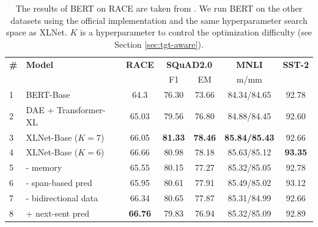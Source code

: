 \begin{table}[!h]
	\small
	\centering
	
	\begin{tabular}{ll|ccccc}
		\toprule
		\bf \# & \bf Model & \bf RACE & \multicolumn{2}{c}{\bf SQuAD2.0} & \bf MNLI & \bf SST-2 \\
		& & & F1 & EM & m/mm &   \\
		\midrule
		1 & BERT-Base                 & 64.3  & 76.30 & 73.66 & 84.34/84.65 & 92.78 \\
		2 & DAE + Transformer-XL & 65.03 & 79.56 & 76.80 & 84.88/84.45 & 92.60 \\
		3 & XLNet-Base ($K=7$)        & 66.05 & \bf 81.33 & \bf 78.46 & \bf 85.84/85.43 & 92.66 \\
		4 & XLNet-Base ($K=6$)        & 66.66 & 80.98 & 78.18 & 85.63/85.12 & \bf 93.35 \\
		5 & \quad - memory             & 65.55 & 80.15 & 77.27 & 85.32/85.05 & 92.78 \\
		6 & \quad - span-based pred    & 65.95 & 80.61 & 77.91 & 85.49/85.02 & 93.12 \\
		7 & \quad - bidirectional data & 66.34 & 80.65 & 77.87 & 85.31/84.99 & 92.66 \\
		8 & \quad + next-sent pred     & \bf 66.76 & 79.83 & 76.94 & 85.32/85.09 & 92.89 \\
		\bottomrule
	\end{tabular}
	\caption{\small
		The results of BERT on RACE are taken from \cite{zhang2019dual}. We run BERT on the other datasets using the official implementation and the same hyperparameter search space as XLNet. $K$ is a hyperparameter to control the optimization difficulty (see Section \ref{sec:tgt-aware}).
	}
	\label{tab:ablation}
\end{table}

